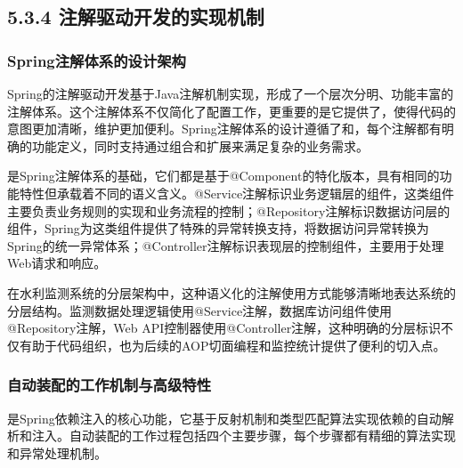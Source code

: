 \hypertarget{ux6ce8ux89e3ux9a71ux52a8ux5f00ux53d1ux7684ux5b9eux73b0ux673aux5236}{%
\subsection{5.3.4 注解驱动开发的实现机制}\label{ux6ce8ux89e3ux9a71ux52a8ux5f00ux53d1ux7684ux5b9eux73b0ux673aux5236}}

\hypertarget{springux6ce8ux89e3ux4f53ux7cfbux7684ux8bbeux8ba1ux67b6ux6784}{%
\subsubsection{Spring注解体系的设计架构}\label{springux6ce8ux89e3ux4f53ux7cfbux7684ux8bbeux8ba1ux67b6ux6784}}

Spring的注解驱动开发基于Java注解机制实现，形成了一个层次分明、功能丰富的注解体系。这个注解体系不仅简化了配置工作，更重要的是它提供了，使得代码的意图更加清晰，维护更加便利。Spring注解体系的设计遵循了和，每个注解都有明确的功能定义，同时支持通过组合和扩展来满足复杂的业务需求。

是Spring注解体系的基础，它们都是基于@Component的特化版本，具有相同的功能特性但承载着不同的语义含义。@Service注解标识业务逻辑层的组件，这类组件主要负责业务规则的实现和业务流程的控制；@Repository注解标识数据访问层的组件，Spring为这类组件提供了特殊的异常转换支持，将数据访问异常转换为Spring的统一异常体系；@Controller注解标识表现层的控制组件，主要用于处理Web请求和响应。

在水利监测系统的分层架构中，这种语义化的注解使用方式能够清晰地表达系统的分层结构。监测数据处理逻辑使用@Service注解，数据库访问组件使用@Repository注解，Web API控制器使用@Controller注解，这种明确的分层标识不仅有助于代码组织，也为后续的AOP切面编程和监控统计提供了便利的切入点。

\hypertarget{ux81eaux52a8ux88c5ux914dux7684ux5de5ux4f5cux673aux5236ux4e0eux9ad8ux7ea7ux7279ux6027}{%
\subsubsection{自动装配的工作机制与高级特性}\label{ux81eaux52a8ux88c5ux914dux7684ux5de5ux4f5cux673aux5236ux4e0eux9ad8ux7ea7ux7279ux6027}}

是Spring依赖注入的核心功能，它基于反射机制和类型匹配算法实现依赖的自动解析和注入。自动装配的工作过程包括四个主要步骤，每个步骤都有精细的算法实现和异常处理机制。

